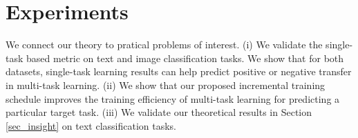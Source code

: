 \section{Experiments}

We connect our theory to pratical problems of interest.
(i) We validate the single-task based metric on text and image classification tasks.
We show that for both datasets, single-task learning results can help predict positive or negative transfer in multi-task learning.
(ii) We show that our proposed incremental training schedule improves the training efficiency of multi-task learning for predicting a particular target task.
(iii) We validate our theoretical results in Section \ref{sec_insight} on text classification tasks.

